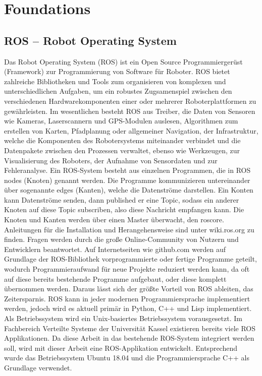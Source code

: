 \chapter{Foundations}
\label{sec:foundations}

\section{ROS – Robot Operating System}
\label{sec:ros}

Das Robot Operating System (ROS) ist ein Open Source Programmiergerüst (Framework)  zur Programmierung von Software für Roboter. ROS bietet zahlreiche Bibliotheken und Tools zum organisieren von komplexen und unterschiedlichen Aufgaben, um ein robustes Zugsamenspiel zwischen den verschiedenen Hardwarekomponenten einer oder mehrerer Roboterplattformen zu gewährleisten.  Im wesentlichen besteht ROS aus Treiber, die Daten von Sensoren wie Kameras, Laserscannern und GPS-Modulen auslesen, Algorithmen zum erstellen von Karten, Pfadplanung oder allgemeiner Navigation, der Infrastruktur, welche die Komponenten des Robotersystems miteinander verbindet und die Datenpakete zwischen den Prozessen verwaltet, ebenso wie Werkzeugen, zur Visualisierung des Roboters, der Aufnahme von Sensordaten und zur Fehleranalyse. 
Ein ROS-System besteht aus einzelnen Programmen, die in ROS nodes (Knoten) genannt werden. Die Programme kommunizieren untereinander über sogenannte edges (Kanten), welche die Datenströme darstellen. Ein Konten kann Datenströme senden, dann published er eine Topic, sodass ein anderer Knoten auf diese Topic subscriben, also diese Nachricht empfangen kann. Die Knoten und Kanten werden über einen Master überwacht, den roscore. 
Anleitungen für die Installation und Herangehensweise sind unter wiki.ros.org zu finden. Fragen werden durch die große Online-Community von Nutzern und Entwicklern beantwortet. 
Auf Internetseiten wie github.com werden auf Grundlage der ROS-Bibliothek vorprogrammierte oder fertige Programme geteilt, wodurch Programmieraufwand für neue Projekte reduziert werden kann, da oft auf diese bereits bestehende Programme aufgebaut, oder diese komplett übernommen werden. Daraus lässt sich der größte Vorteil von ROS ableiten, das Zeitersparnis.
ROS kann in jeder modernen Programmiersprache implementiert werden, jedoch wird es aktuell primär in Python, C++ und Lisp implementiert. Als Betriebssystem wird ein Unix-basiertes Betriebssystem vorausgesetzt. 
Im Fachbereich Verteilte Systeme der Universität Kassel existieren bereits viele ROS Applikationen. Da diese Arbeit in das bestehende ROS-System integriert werden soll, wird mit dieser Arbeit eine ROS-Applikation entwickelt. Entsprechend wurde das Betriebssystem Ubuntu 18.04 und die Programmiersprache C++ als Grundlage verwendet. 





